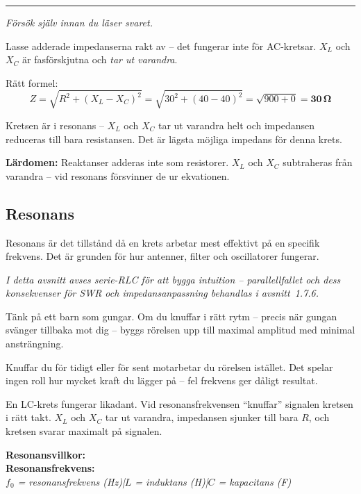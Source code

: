 \documentclass[a4paper,11pt,twoside]{book}
\newcommand{\emoji}[1]{{\emojifont #1}}
\begin{document}
\medskip
\noindent\rule{\textwidth}{0.4pt}
{\small\itshape Försök själv innan du läser svaret.}
\medskip

\begin{worked}[title={Lösning -- Fallgropsfråga 1.7.3\,F}]
Lasse adderade impedanserna rakt av -- det fungerar
inte för AC-kretsar. $X_L$ och $X_C$ är fasförskjutna
och \emph{tar ut varandra}.

Rätt formel:
\[ Z = \sqrt{R^2 + (X_L - X_C)^2} = \sqrt{30^2 + (40-40)^2}
   = \sqrt{900 + 0} = \mathbf{30\,\Omega} \]

Kretsen är i resonans -- $X_L$ och $X_C$ tar ut
varandra helt och impedansen reduceras till bara
resistansen. Det är lägsta möjliga impedans för
denna krets.

\textbf{Lärdomen:} Reaktanser adderas inte som
resistorer. $X_L$ och $X_C$ subtraheras från
varandra -- vid resonans försvinner de ur ekvationen.
\end{worked}


\subsection{Resonans}

Resonans är det tillstånd då en krets arbetar mest
effektivt på en specifik frekvens. Det är grunden
för hur antenner, filter och oscillatorer fungerar.

{\small\itshape I detta avsnitt avses serie-RLC för
att bygga intuition -- parallellfallet och dess
konsekvenser för SWR och impedansanpassning
behandlas i avsnitt~1.7.6.}

\begin{storybox}[{\emoji{💡} Barnet på gungan}]
Tänk på ett barn som gungar. Om du knuffar i rätt
rytm -- precis när gungan svänger tillbaka mot
dig -- byggs rörelsen upp till maximal amplitud
med minimal ansträngning.

Knuffar du för tidigt eller för sent motarbetar
du rörelsen istället. Det spelar ingen roll hur
mycket kraft du lägger på -- fel frekvens ger
dåligt resultat.

En LC-krets fungerar likadant. Vid resonansfrekvensen
``knuffar'' signalen kretsen i rätt takt. $X_L$
och $X_C$ tar ut varandra, impedansen sjunker till
bara $R$, och kretsen svarar maximalt på signalen.
\end{storybox}

\begin{formulabox}
\textbf{Resonansvillkor:}\\[4mm]
\textbf{Resonansfrekvens:}\\[3mm]
{\small\normalfont\itshape
$f_0$ = resonansfrekvens (Hz)\quad|\quad$L$ = induktans (H)\quad|\quad$C$ = kapacitans (F)}
\end{formulabox}
\end{document}
